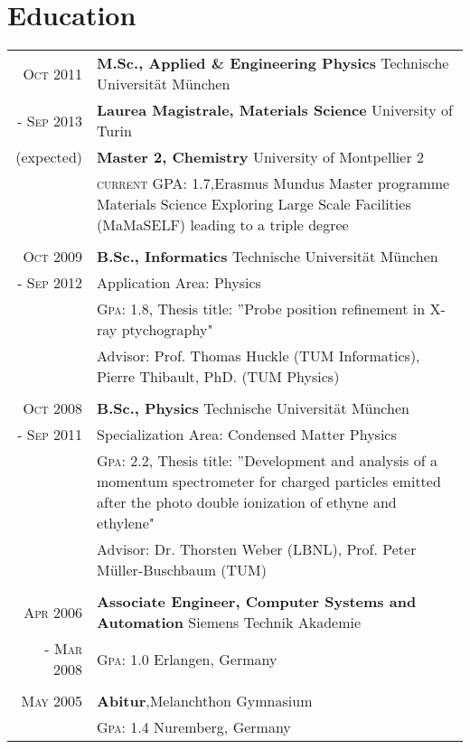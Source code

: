 \documentclass[a4paper,10pt]{article}
\begin{document}
\section{Education}
\begin{tabularx}{19cm}{rX}	

\textsc{Oct 2011}& \textbf{M.Sc., Applied \& Engineering Physics} \hfill{Technische Universität München}\\
\textsc{- Sep 2013} & \textbf{Laurea Magistrale, Materials Science} \hfill{University of Turin}\\
 (expected)&  \textbf{Master 2, Chemistry} \hfill{University of Montpellier 2}\\
 &  \textsc{current GPA}: 1.7,\small{Erasmus Mundus Master programme Materials Science Exploring Large Scale Facilities (MaMaSELF) leading to a triple degree}\\\\

\textsc{Oct 2009}& \textbf{B.Sc., Informatics} \hfill{Technische Universität München}\\
\textsc{- Sep 2012} & Application Area: Physics\\
 & \textsc{Gpa}: 1.8, \small{Thesis title: ”Probe position refinement in X-ray ptychography"}\\
& Advisor: Prof. Thomas Huckle (TUM Informatics), Pierre Thibault, PhD. (TUM Physics)
\\\\

\textsc{Oct 2008}& \textbf{B.Sc.,  Physics} \hfill\normalsize{Technische Universität München}\\
 \textsc{- Sep 2011}& Specialization Area: Condensed Matter Physics \\
& \textsc{Gpa}: 2.2, \small{Thesis title: ”Development and analysis of a momentum spectrometer for charged particles emitted after the photo double ionization of ethyne and ethylene"}\\
& Advisor: Dr. Thorsten Weber (LBNL),  Prof. Peter Müller-Buschbaum (TUM) \\\\


\textsc{Apr 2006}& \textbf{Associate Engineer, Computer Systems and Automation} \hfill  {Siemens Technik Akademie}\\
\textsc{- Mar 2008}& \textsc{Gpa}: 1.0  \hfill Erlangen, Germany\\
 &\\ \textsc{May} 2005& \textbf{Abitur},\hfill  Melanchthon Gymnasium \\
&  \textsc{Gpa}: 1.4 \hfill Nuremberg, Germany

\end{tabularx}
\end{document}
